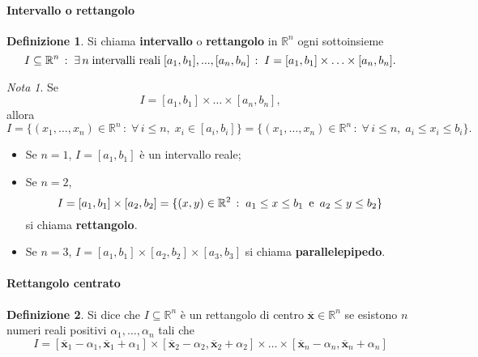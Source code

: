 \documentclass{article}
\theoremstyle{plain}
\theoremstyle{definition}
\newtheorem{defn}{Definizione}[section]
\theoremstyle{remark}
\newtheorem{note}{Nota}
\begin{document}
\vspace{10pt}

\paragraph{Intervallo o rettangolo}
\begin{bxthm}
\begin{defn}
    Si chiama \textbf{intervallo} o \textbf{rettangolo} in $\mathbb{R}^n$ ogni sottoinsieme
    \[I\subseteq\mathbb{R}^n\,:\;\exists\, n\; \textup{intervalli reali}\; [a_1,b_1],...,[a_n,b_n]\,:\;I=[a_1,b_1]\times\ldots\times[a_n,b_n].\]
\end{defn}
\end{bxthm}

\vspace{10pt}

\begin{note}
    Se 
    \[I=[a_1,b_1]\times\ldots\times[a_n,b_n],\] 
    allora 
    \[I=\{(x_1,\ldots,x_n)\in\mathbb{R}^n\,:\;\forall\, i\leq n,\; x_i\in[a_i,b_i]\}=\{(x_1,\ldots,x_n)\in\mathbb{R}^n\,:\;\forall\, i\leq n,\; a_i\leq x_i\leq b_i\}.\]    
\begin{itemize}
    \item Se $n=1$, $I=[a_1,b_1]$ è un intervallo reale;
    \item Se $n=2$, 
    \[I=[a_1,b_1]\times[a_2,b_2]=\{(x,y)\in\mathbb{R}^2\,:\;a_1\leq x\leq b_1\,\textup{ e }\,a_2\leq y\leq b_2\}\]
    si chiama \textbf{rettangolo}.
    \item Se $n=3$, \(I=[a_1,b_1]\times[a_2,b_2]\times[a_3,b_3]\) si chiama \textbf{parallelepipedo}.
\end{itemize}
\end{note}

\vspace{10pt}

\paragraph{Rettangolo centrato}
\begin{bxthm}
\begin{defn}
    Si dice che $I\subseteq\mathbb{R}^n$ è un rettangolo di centro $\overline{\mathbf{x}}\in\mathbb{R}^n$ se esistono $n$ numeri reali positivi $\alpha_1,\ldots,\alpha_n$ tali che
    \[I=[\overline{\mathbf{x}}_1-\alpha_1,\overline{\mathbf{x}}_1+\alpha_1]\times [\overline{\mathbf{x}}_2-\alpha_2,\overline{\mathbf{x}}_2+\alpha_2]\times\ldots\times [\overline{\mathbf{x}}_n-\alpha_n,\overline{\mathbf{x}}_n+\alpha_n]\]
\end{defn}
\end{bxthm}
\end{document}
